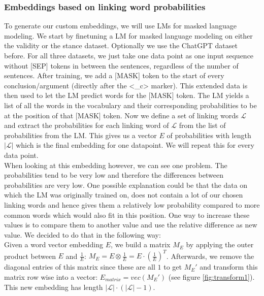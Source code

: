 \subsubsection{Embeddings based on linking word probabilities} \label{sec:linkingembeddings}
To generate our custom embeddings, we will use LMs for masked language modeling. We start by finetuning a LM for masked language modeling \cite{bertmask} on either the validity or the stance dataset. Optionally we use the ChatGPT dataset before. For all three datasets, we just take one data point as one input sequence without [SEP] tokens in between the sentences, regardless of the number of sentences. After training, we add a [MASK] token to the start of every conclusion/argument (directly after the <\_c> marker). This extended data is then used to let the LM predict words for the [MASK] token. The LM yields a list of all the words in the vocabulary and their corresponding probabilities to be at the position of that [MASK] token. Now we define a set of linking words $\mathcal{L}$ and extract the probabilities for each linking word of $\mathcal{L}$ from the list of probabilities from the LM. This gives us a vector $E$ of probabilities with length $|\mathcal{L}|$ which is the final embedding for one datapoint. We will repeat this for every data point. \\

When looking at this embedding however, we can see one problem. The probabilities tend to be very low and therefore the differences between probabilities are very low. One possible explanation could be that the data on which the LM was originally trained on, does not contain a lot of our chosen linking words and hence gives them a relatively low probability compared to more common words which would also fit in this position. One way to increase these values is to compare them to another value and use the relative difference as new value. We decided to do that in the following way: \\
Given a word vector embedding $E$, we build a matrix $M_E$ by applying the outer product between $E$ and $\frac{1}{E}$: $M_E = E \otimes \frac{1}{E} = E \cdot (\frac{1}{E})^T$.
Afterwards, we remove the diagonal entries of this matrix since these are all $1$ to get $M_E'$ and transform this matrix row wise into a vector: $E_{matrix} = vec(M_E')$ (see figure \ref{fig:transform1}). This new embedding has length $|\mathcal{L}| \cdot (|\mathcal{L}|-1)$.

